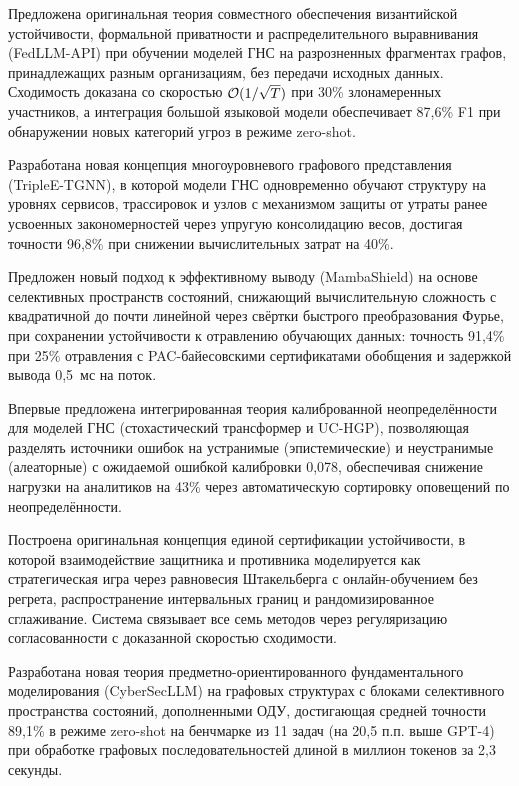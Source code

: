 Предложена оригинальная теория совместного обеспечения византийской устойчивости, формальной приватности и распределительного выравнивания (FedLLM-API) при обучении моделей ГНС на разрозненных фрагментах графов, принадлежащих разным организациям, без передачи исходных данных. Сходимость доказана со скоростью $\mathcal{O}(1/\sqrt{T})$ при 30\% злонамеренных участников, а интеграция большой языковой модели обеспечивает 87,6\% F1 при обнаружении новых категорий угроз в режиме zero-shot.

Разработана новая концепция многоуровневого графового представления (TripleE-TGNN), в которой модели ГНС одновременно обучают структуру на уровнях сервисов, трассировок и узлов с механизмом защиты от утраты ранее усвоенных закономерностей через упругую консолидацию весов, достигая точности 96,8\% при снижении вычислительных затрат на 40\%.

Предложен новый подход к эффективному выводу (MambaShield) на основе селективных пространств состояний, снижающий вычислительную сложность с квадратичной до почти линейной через свёртки быстрого преобразования Фурье, при сохранении устойчивости к отравлению обучающих данных: точность 91,4\% при 25\% отравления с PAC-байесовскими сертификатами обобщения и задержкой вывода 0,5~мс на поток.

Впервые предложена интегрированная теория калиброванной неопределённости для моделей ГНС (стохастический трансформер и UC-HGP), позволяющая разделять источники ошибок на устранимые (эпистемические) и неустранимые (алеаторные) с ожидаемой ошибкой калибровки 0,078, обеспечивая снижение нагрузки на аналитиков на 43\% через автоматическую сортировку оповещений по неопределённости.

Построена оригинальная концепция единой сертификации устойчивости, в которой взаимодействие защитника и противника моделируется как стратегическая игра через равновесия Штакельберга с онлайн-обучением без регрета, распространение интервальных границ и рандомизированное сглаживание. Система связывает все семь методов через регуляризацию согласованности с доказанной скоростью сходимости.

Разработана новая теория предметно-ориентированного фундаментального моделирования (CyberSecLLM) на графовых структурах с блоками селективного пространства состояний, дополненными ОДУ, достигающая средней точности 89,1\% в режиме zero-shot на бенчмарке из 11 задач (на 20,5 п.п. выше GPT-4) при обработке графовых последовательностей длиной в миллион токенов за 2,3 секунды.

